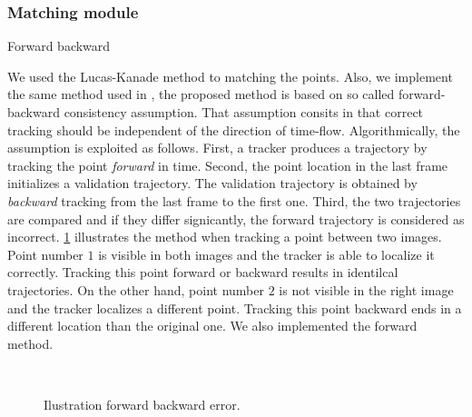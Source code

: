 \subsubsection{Matching module}


Forward backward

We used the Lucas-Kanade method to matching the points. Also, we implement the same method used in \cite{medianFlow}, the proposed method is based on so called forward-backward consistency assumption. That assumption consits in that correct tracking should be independent of the direction of time-flow. Algorithmically, the assumption is exploited as follows. First, a tracker produces a trajectory by tracking the point \textit{forward} in time. Second, the point location in the last frame initializes a validation trajectory. The validation trajectory is obtained by \textit{backward} tracking from the last frame to the first one. Third, the two trajectories are compared and if they differ signicantly, the forward trajectory is considered as incorrect. \ref{motion23} illustrates the method when tracking a point between two images. Point number $1$  is visible in both images and the tracker is able to localize it correctly. Tracking this point forward or backward results in identilcal trajectories. On the other hand, point number $2$ is not visible in the right image and the tracker localizes a different point. Tracking this point backward ends in a different location than the original one. We also implemented the forward method.



\begin{figure}[H]
		
\centering

\\
\caption{Ilustration forward backward error.}
\label{motion23}
\end{figure}

